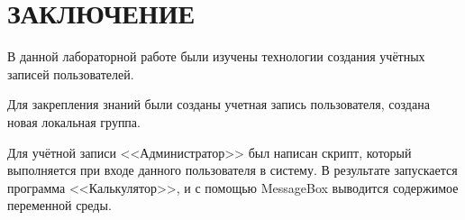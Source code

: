 \section*{ЗАКЛЮЧЕНИЕ}

В данной лабораторной работе были изучены технологии создания
учётных записей пользователей.

Для закрепления знаний были созданы учетная запись пользователя,
создана новая локальная группа.

Для учётной записи <<Администратор>> был написан скрипт, который выполняется
при входе данного пользователя в систему. В результате запускается программа
<<Калькулятор>>, и с помощью MessageBox выводится содержимое переменной среды.

\newpage